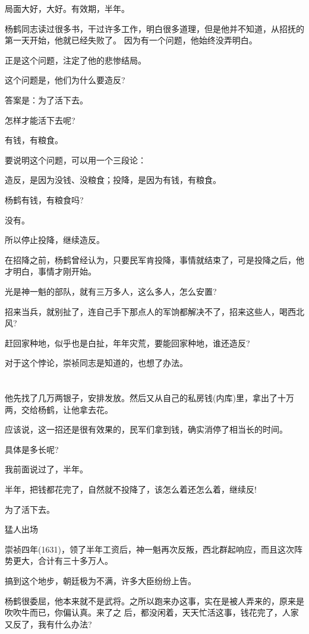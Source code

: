 \documentclass[11pt,a4paper,onecolumn]{article}
\begin{document}
局面大好，大好。有效期，半年。

杨鹤同志读过很多书，干过许多工作，明白很多道理，但是他并不知道，从招抚的第一天开始，他就已经失败了。
因为有一个问题，他始终没弄明白。

正是这个问题，注定了他的悲惨结局。

这个问题是，他们为什么要造反?

答案是：为了活下去。

怎样才能活下去呢?

有钱，有粮食。

要说明这个问题，可以用一个三段论：

造反，是因为没钱、没粮食；投降，是因为有钱，有粮食。

杨鹤有钱，有粮食吗?

没有。

所以停止投降，继续造反。

在招降之前，杨鹤曾经认为，只要民军肯投降，事情就结束了，可是投降之后，他才明白，事情才刚开始。

光是神一魁的部队，就有三万多人，这么多人，怎么安置?

招来当兵，就别扯了，连自己手下那点人的军饷都解决不了，招来这些人，喝西北风?

赶回家种地，似乎也是白扯，年年灾荒，要能回家种地，谁还造反?

对于这个悖论，崇祯同志是知道的，也想了办法。

\section[\thesection]{}

他先找了几万两银子，安排发放。然后又从自己的私房钱(内库)里，拿出了十万两，交给杨鹤，让他拿去花。

应该说，这一招还是很有效果的，民军们拿到钱，确实消停了相当长的时间。

具体是多长呢?

我前面说过了，半年。

半年，把钱都花完了，自然就不投降了，该怎么着还怎么着，继续反!

为了活下去。

猛人出场

崇祯四年(1631)，领了半年工资后，神一魁再次反叛，西北群起响应，而且这次阵势更大，合计有三十多万人。

搞到这个地步，朝廷极为不满，许多大臣纷纷上告。

杨鹤很委屈，他本来就不是武将。之所以跑来办这事，实在是被人弄来的，原来是吹吹牛而已，你偏认真。来了之
后，都没闲着，天天忙活这事，钱花完了，人家又反了，我有什么办法?
\end{document}
